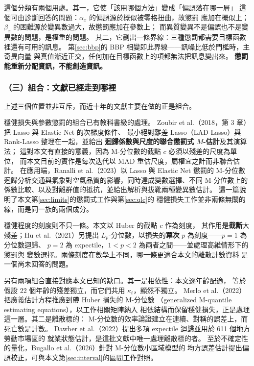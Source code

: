 \documentclass[UTF8, fontset=macnew, a4paper, 12pt]{ctexart}
\begin{document}
這個分類有兩個用處。其一，它使「該用哪個方法」變成「偏誤落在哪一層」
這個可由診斷回答的問題：$\alpha_x$ 的偏誤源於概似被零格扭曲，故懲罰
應加在概似上；$\beta_x$ 的困難源於變異數過大，故懲罰應加在參數上；
而異質變異不是偏誤也不是變異數的問題，是權重的問題。
其二，它劃出一條界線：三種懲罰都需要目標函數裡還有可用的訊息。
第\ref{sec:bbp}的 BBP 相變即此界線——訊噪比低於門檻時，主奇異向量
與真值漸近正交，任何加在目標函數上的項都無法把訊息變出來。
\textbf{懲罰能重新分配資訊，不能創造資訊。}

\subsubsection{（三）組合：文獻已經走到哪裡}

上述三個位置並非互斥，而近十年的文獻主要在做的正是組合。

穩健損失與參數懲罰的組合已有教科書級的處理。
Zoubir et al.（2018，第 3 章）把 Lasso 與 Elastic Net 的次梯度條件、
最小絕對離差 Lasso（LAD-Lasso）與 Rank-Lasso 整理在一起，並給出
\textbf{迴歸係數與尺度的聯合懲罰式 $M$-估計}及其演算法；
這對本文有直接的意義，因為 M-分位數的截點 $c$ 必須以殘差的尺度為單位，
而本文目前的實作是每次迭代以 MAD 重估尺度，屬權宜之計而非聯合估計。
在應用端，Ranalli et al.（2023）以 Lasso 與 Elastic Net 懲罰的 M-分位數
迴歸分析交通與氣象對空氣品質的影響，同時達成變數選擇、不同 M-分位數上的
係數比較、以及對離群值的抵抗，並給出解析與拔靴兩種變異數估計。
這一篇說明了本文第\ref{sec:limits}的懲罰式工作與第\ref{sec:qlc}的
穩健損失工作並非兩條無關的線，而是同一族的兩個成分。

穩健程度的刻度則不只一條。本文以 Huber 的截點 $c$ 作為刻度，
其作用是\textbf{截斷}大殘差；Hu et al.（2021）另提出
$L_p$-分位數，以損失的\textbf{冪次} $p$ 為刻度——$p=1$ 為分位數迴歸、
$p=2$ 為 expectile，$1<p<2$ 為兩者之間——並處理高維情形下的懲罰與
變數選擇。兩條刻度在數學上不同，哪一條更適合本文的離散計數資料
是一個尚未回答的問題。

另有兩項組合直接對應本文已知的缺口。其一是相依性：本文逐年齡配適，
等於假設 22 個年齡的殘差獨立，而它們共用 $\kappa_t$，顯然不獨立。
Merlo et al.（2022）把廣義估計方程推廣到帶 Huber 損失的 M-分位數
（generalized M-quantile estimating equations），以工作相關矩陣納入
相依結構而保留穩健損失，正是處理這一層。其二是離散標的：
M-分位數的效率論證建立在連續、對稱的誤差上，而死亡數是計數。
Dawber et al.（2022）提出多項 expectile 迴歸並用於 611 個地方勞動市場區的
就業狀態估計，是這批文獻中唯一處理離散標的者。
至於不確定性的量化，Bugallo et al.（2026）針對 M-分位數小區域模型的
均方誤差估計提出偏誤校正，可與本文第\ref{sec:interval}的區間工作對照。
\end{document}
